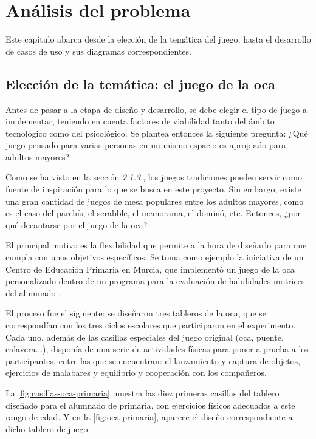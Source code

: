 \section{Análisis del problema}

Este capítulo abarca desde la elección de la temática del juego, hasta el desarrollo de casos de uso y sus diagramas correspondientes.

\subsection{Elección de la temática: el juego de la oca}

Antes de pasar a la etapa de diseño y desarrollo, se debe elegir el tipo de juego a implementar, teniendo en cuenta factores de viabilidad tanto del ámbito tecnológico como del psicológico. Se plantea entonces la siguiente pregunta: ¿Qué juego pensado para varias personas en un mismo espacio es apropiado para adultos mayores?

Como se ha visto en la sección \textit{2.1.3.}, los juegos tradiciones pueden servir como fuente de inspiración para lo que se busca en este proyecto. Sin embargo, existe una gran cantidad de juegos de mesa populares entre los adultos mayores, como es el caso del parchís, el scrabble, el memorama, el dominó, etc. Entonces, ¿por qué decantarse por el juego de la oca?

El principal motivo es la flexibilidad que permite a la hora de diseñarlo para que cumpla con unos objetivos específicos. Se toma como ejemplo la iniciativa de un Centro de Educación Primaria en Murcia, que implementó un juego de la oca personalizado dentro de un programa para la evaluación de habilidades motrices del alumnado \parencite{experienciaOca}.

El proceso fue el siguiente: se diseñaron tres tableros de la oca, que se correspondían con los tres ciclos escolares que participaron en el experimento. Cada uno, además de las casillas especiales del juego original (oca, puente, calavera...), disponía de una serie de actividades físicas para poner a prueba a los participantes, entre las que se encuentran: el lanzamiento y captura de objetos, ejercicios de malabares y equilibrio y cooperación con los compañeros.

La \autoref{fig:casillas-oca-primaria} muestra las diez primeras casillas del tablero diseñado para el alumnado de primaria, con ejercicios físicos adecuados a este rango de edad. Y en la \autoref{fig:oca-primaria}, aparece el diseño correspondiente a dicho tablero de juego.

